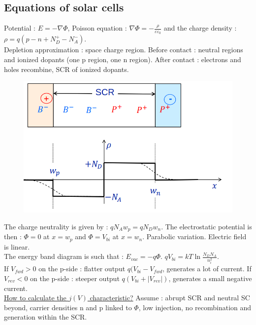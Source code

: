 \documentclass[../main.tex]{subfiles}
\begin{document}
\subsection{Equations of solar cells}
Potential : $E = -\nabla \Phi$, Poisson equation : $\nabla \Phi = -\frac{\rho}{\varepsilon \varepsilon_0}$ and the charge density : $\rho = q(p-n+N_D^+ - N_A^-)$. \\

Depletion approximation : space charge region. Before contact : neutral regions and ionized dopants (one p region, one n region). After contact : electrons and holes recombine, SCR of ionized dopants. 
\begin{figure}[hbt!]
    \centering
    \includegraphics[width=0.5\linewidth]{IMAGES/PV/Screenshot from 2025-04-08 13-24-32.png}
\end{figure}

The charge neutrality is given by : $qN_A w_p = q N_D w_n$. The electrostatic potential is then : $\Phi=0$ at $x=w_p$ and $\Phi = V_{bi}$ at $x=w_n$. Parabolic variation. Electric field is linear.\\
The energy band diagram is such that : $E_{vac} = -q\Phi$. $qV_{bi} = kT \ln \frac{N_DN_A}{n_i^2}$.\\
If $V_{fwd}>0$ on the p-side : flatter output $q(V_{bi} - V_{fwd}$, generates a lot of current. If $V_{rev}<0$ on the p-side : steeper output $q(V_{bi} + \lvert V_{rev} \rvert )$, generates a small negative current.\\

\underline{How to calculate the $j(V)$ characteristic?} Assume : abrupt SCR and neutral SC beyond, carrier densities n and p linked to $\Phi$, low injection, no recombination and generation within the SCR. \\
\end{document}
